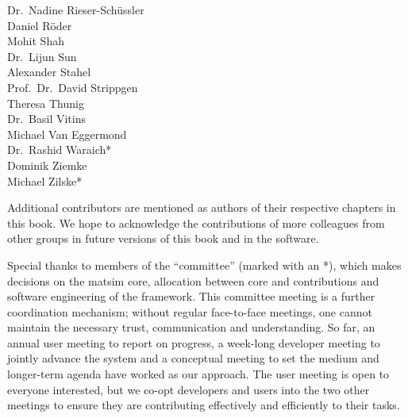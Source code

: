 \begin{multicols}{3}
Dr.~Nadine Rieser-Schüssler \\
Daniel Röder \\
Mohit Shah \\
Dr.~Lijun Sun \\
Alexander Stahel \\
Prof.~Dr.~David Strippgen \\
Theresa Thunig \\
Dr.~Basil Vitins \\
Michael Van Eggermond \\
Dr.~Rashid Waraich\mbox{*} \\
Dominik Ziemke \\
Michael Zilske\mbox{*} \\
\end{multicols}
% 
Additional contributors are mentioned as authors of their respective chapters in this book.  We hope to acknowledge the contributions of more colleagues from other groups in future versions of this book and in the software.   



Special thanks to members of the ``committee'' (marked with an \mbox{*}), which makes 
decisions on the \gls{matsim} core, allocation between core and \glspl{contribution} and software engineering of the \gls{framework}.
%
%
This committee meeting is a further coordination mechanism; without regular face-to-face meetings, one cannot maintain the necessary trust, communication and understanding. So far, an annual user meeting to report on progress, a week-long developer meeting to jointly advance the system and a conceptual meeting to set the medium and longer-term agenda have worked as our approach. The user meeting is open to everyone interested, but we co-opt developers and users into the two other meetings to ensure they are contributing effectively and efficiently to their tasks. 


